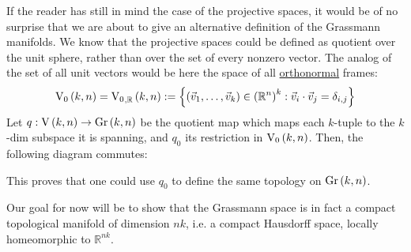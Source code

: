 If the reader has still in mind the case of the projective spaces, it would be of no surprise that we are about to give an alternative definition of the Grassmann manifolds. We know that the projective spaces could be defined as quotient over the unit sphere, rather than over the set of every nonzero vector. The analog of the set of all unit vectors would be here the space of all \ul{orthonormal} frames:
$$\StO{k}{n}=\StO{k}{n}{\mathbb{R}}:=\left\{\left(\vec{v}_1,\ldots,\vec{v}_k\right)\in\left(\mathbb{R}^n\right)^k:\vec{v}_i\cdot\vec{v}_j=\delta_{i,j}\right\}$$
Let $q:\St{k}{n}\to\Gr{k}{n}$ be the quotient map which maps each $k$-tuple to the $k$-dim subspace it is spanning, and $q_0$ its restriction in $\StO{k}{n}$. Then, the following diagram commutes:
\begin{center}
\end{center}
This proves that one could use $q_0$ to define the same topology on $\Gr{k}{n}$.

Our goal for now will be to show that the Grassmann space is in fact a compact topological manifold of dimension $nk$, i.e. a compact Hausdorff space, locally homeomorphic to $\mathbb{R}^{nk}$.

